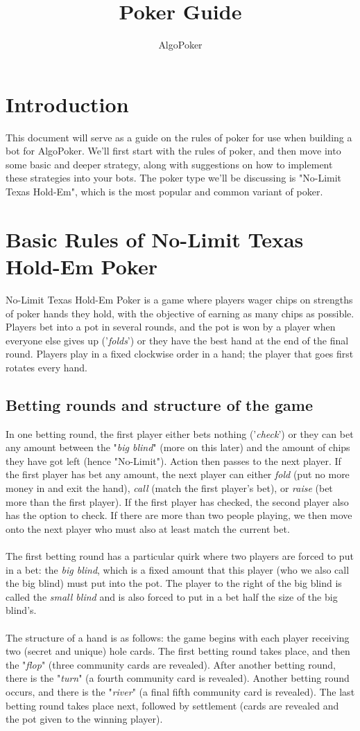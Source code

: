 \documentclass{article}
\title{Poker Guide}
\author{AlgoPoker}
\begin{document}
\maketitle
\tableofcontents
\newpage 
\section{Introduction}
This document will serve as a guide on the rules of poker for use when building a bot for AlgoPoker. We'll first start with the rules of poker, and then move into some basic and deeper strategy, along with suggestions on how to implement these strategies into your bots. The poker type we'll be discussing is "No-Limit Texas Hold-Em", which is the most popular and common variant of poker.
\section{Basic Rules of No-Limit Texas Hold-Em Poker}
No-Limit Texas Hold-Em Poker is a game where players wager chips on strengths of poker hands they hold, with the objective of earning as many chips as possible. Players bet into a pot in several rounds, and the pot is won by a player when everyone else gives up ('\emph{folds}') or they have the best hand at the end of the final round. Players play in a fixed clockwise order in a hand; the player that goes first rotates every hand. 
\subsection{Betting rounds and structure of the game}
In one betting round, the first player either bets nothing ('\emph{check}') or they can bet any amount between the "\emph{big blind}" (more on this later) and the amount of chips they have got left (hence "No-Limit"). Action then passes to the next player. If the first player has bet any amount, the next player can either \emph{fold} (put no more money in and exit the hand), \emph{call} (match the first player's bet), or \emph{raise} (bet more than the first player). If the first player has checked, the second player also has the option to check. If there are more than two people playing, we then move onto the next player who must also at least match the current bet.\\\\
The first betting round has a particular quirk where two players are forced to put in a bet: the \emph{big blind}, which is a fixed amount that this player (who we also call the big blind) must put into the pot. The player to the right of the big blind is called the \emph{small blind} and is also forced to put in a bet half the size of the big blind's.\\\\
The structure of a hand is as follows: the game begins with each player receiving two (secret and unique) hole cards. The first betting round takes place, and then the "\emph{flop}" (three community cards are revealed). After another betting round, there is the "\emph{turn}" (a fourth community card is revealed). Another betting round occurs, and there is the "\emph{river}" (a final fifth community card is revealed). The last betting round takes place next, followed by settlement (cards are revealed and the pot given to the winning player).
\newpage
\end{document}
